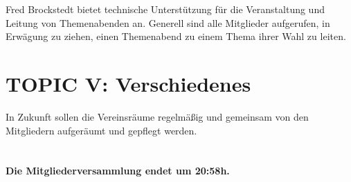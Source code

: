 \documentclass[11pt,a4paper,ngerman]{article}
\begin{document}
Fred Brockstedt bietet technische Unterstützung für die Veranstaltung und 
Leitung von Themenabenden an. Generell sind alle Mitglieder aufgerufen, in 
Erwägung zu ziehen, einen Themenabend zu einem Thema ihrer Wahl zu leiten.



\section{TOPIC V: Verschiedenes}


In Zukunft sollen die Vereinsräume regelmäßig und gemeinsam von den 
Mitgliedern aufgeräumt und gepflegt werden.\\
\\
\\
\textbf{Die Mitgliederversammlung endet um 20:58h.}
\end{document}
